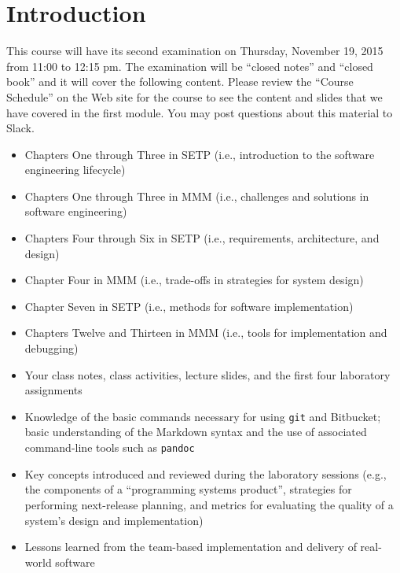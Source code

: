 


\section*{Introduction}

This course will have its second examination on Thursday, November 19, 2015 from 11:00 to 12:15 pm. The examination will
be ``closed notes'' and ``closed book'' and it will cover the following content. Please review the ``Course Schedule''
on the Web site for the course to see the content and slides that we have covered in the first module. You may post
questions about this material to Slack.

\begin{itemize}

  \itemsep 0in

  \item Chapters One through Three in SETP (i.e., introduction to the software engineering lifecycle)

  \item Chapters One through Three in MMM (i.e., challenges and solutions in software engineering)

  \item Chapters Four through Six in SETP (i.e., requirements, architecture, and design)

  \item Chapter Four in MMM (i.e., trade-offs in strategies for system design)

  \item Chapter Seven in SETP (i.e., methods for software implementation)

  \item Chapters Twelve and Thirteen in MMM (i.e., tools for implementation and debugging)

  \item Your class notes, class activities, lecture slides, and the first four laboratory assignments

  \item Knowledge of the basic commands necessary for using {\tt git} and Bitbucket; basic understanding of the Markdown
    syntax and the use of associated command-line tools such as {\tt pandoc}

  \item Key concepts introduced and reviewed during the laboratory sessions (e.g., the components of a ``programming
    systems product'', strategies for performing next-release planning, and metrics for evaluating the quality of a
    system's design and implementation)

  \item Lessons learned from the team-based implementation and delivery of real-world software

\end{itemize}

